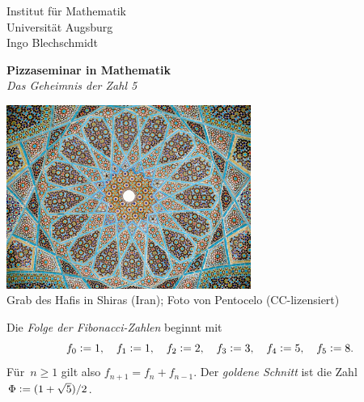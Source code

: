 \documentclass[a4paper,ngerman,twoside]{scrartcl}
\newcommand{\defeq}{\vcentcolon=}
\begin{document}
\thispagestyle{empty}
Institut für Mathematik \\
Universität Augsburg \\
Ingo Blechschmidt

\begin{center}
  \textbf{Pizzaseminar in Mathematik} \\
  \emph{Das Geheimnis der Zahl 5}
\end{center}
\vspace{0.5em}

\begin{center}\href{https://commons.wikimedia.org/wiki/File:Roof_hafez_tomb.jpg}{\includegraphics[width=0.60\textwidth]{hafez-tomb}} \\
\scriptsize Grab des Hafis in Shiras (Iran); Foto von Pentocelo (CC-lizensiert)\par
\end{center}
\vspace{0.5em}

Die \emph{Folge der Fibonacci-Zahlen} beginnt mit
\[
  f_0 \defeq 1, \quad
  f_1 \defeq 1, \quad
  f_2 \defeq 2, \quad
  f_3 \defeq 3, \quad
  f_4 \defeq 5, \quad
  f_5 \defeq 8.
\]
Für~$n \geq 1$ gilt also $f_{n+1} = f_n + f_{n-1}$. Der \emph{goldene Schnitt}
ist die Zahl~$\Phi \defeq (1+\sqrt{5})/2$.
\vspace{1em}
\enlargethispage{0.5em}
\end{document}
